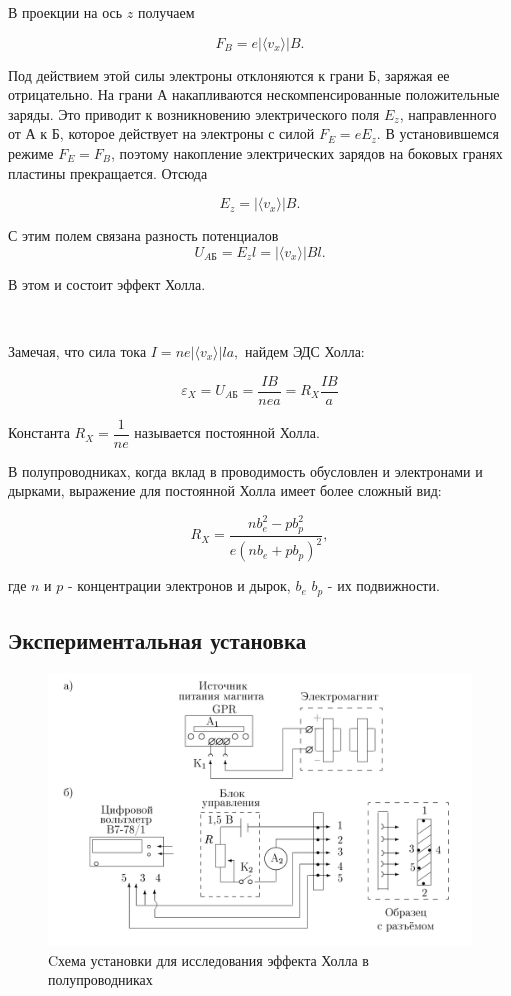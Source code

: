 \documentclass[12pt,a4paper]{article}
\begin{document}
	В проекции на ось $z$ получаем
	
	$$ F_{B}=e | \langle {v_{x}} \rangle | B.$$
	
	Под действием этой силы электроны отклоняются к грани Б, заряжая ее отрицательно. На грани А накапливаются нескомпенсированные положительные заряды. Это приводит к возникновению электрического поля $E_{z}$, направленного от А к Б, которое действует на электроны с силой $F_{E}=eE_{z}$. В установившемся режиме $F_{E}=F_{B}$, поэтому накопление электрических зарядов на боковых гранях пластины прекращается. Отсюда
	
	$$ E_{z}=| \langle {v_{x}} \rangle | B.$$
	
	С этим полем связана разность потенциалов $$U_{AБ}=E_{z}l=| \langle {v_{x}} \rangle | Bl.$$
	
	В этом и состоит эффект Холла.
	
	\
	
	Замечая, что сила тока $ I=ne| \langle {v_{x}} \rangle |la,$ найдем ЭДС Холла:
	
\begin{equation}\label{Rx}
	\varepsilon_{X}=U_{AБ}=\dfrac{IB}{nea}=R_{X}\dfrac{IB}{a}
\end{equation}
	
	Константа $R_{X}=\dfrac{1}{ne}$ называется постоянной Холла.
	
	В полупроводниках, когда вклад в проводимость обусловлен и электронами и дырками, выражение для постоянной Холла имеет более сложный вид:
	
	$$R_{X}=\dfrac{nb^{2}_{e}-pb^{2}_{p}}{e(nb_{e}+pb_{p})^{2}},$$
	
	где $n$ и $p$ - концентрации электронов и дырок, $b_{e}$ $b_{p}$ - их подвижности.
\subsection*{Экспериментальная установка}
\begin{figure}[htp]
\centering
    \includegraphics[width=\linewidth]{scheme.png}
    \caption{Cхема установки для исследования эффекта Холла в полупроводниках}
\end{figure}
\end{document}
